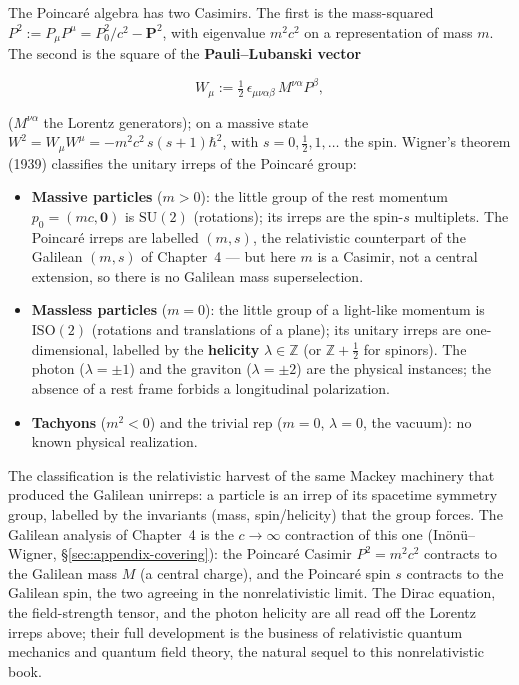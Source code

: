 The Poincar\'e algebra has two Casimirs. The first is the mass-squared $P^{2}:=P_{\mu}P^{\mu}=P_{0}^{2}/c^{2}-\bm P^{2}$, with eigenvalue $m^{2}c^{2}$ on a representation of mass $m$. The second is the square of the \textbf{Pauli--Lubanski vector}
\begin{linenomath}
\begin{equation}
W_{\mu}:=\tfrac12\,\epsilon_{\mu\nu\alpha\beta}\,M^{\nu\alpha}P^{\beta},
\label{eq:pauli-lubanski}
\end{equation}
\end{linenomath}
($M^{\nu\alpha}$ the Lorentz generators); on a massive state $W^{2}=W_{\mu}W^{\mu}=-m^{2}c^{2}\,s(s+1)\hbar^{2}$, with $s=0,\tfrac12,1,\ldots$ the spin. Wigner's theorem (1939) classifies the unitary irreps of the Poincar\'e group:
\begin{itemize}
\item \textbf{Massive particles} ($m>0$): the little group of the rest momentum $p_{0}=(mc,\bm 0)$ is $\mathrm{SU}(2)$ (rotations); its irreps are the spin-$s$ multiplets. The Poincar\'e irreps are labelled $(m,s)$, the relativistic counterpart of the Galilean $(m,s)$ of Chapter~4 --- but here $m$ is a Casimir, not a central extension, so there is no Galilean mass superselection.
\item \textbf{Massless particles} ($m=0$): the little group of a light-like momentum is $\mathrm{ISO}(2)$ (rotations and translations of a plane); its unitary irreps are one-dimensional, labelled by the \textbf{helicity} $\lambda\in\mathbb Z$ (or $\mathbb Z+\tfrac12$ for spinors). The photon ($\lambda=\pm1$) and the graviton ($\lambda=\pm2$) are the physical instances; the absence of a rest frame forbids a longitudinal polarization.
\item \textbf{Tachyons} ($m^{2}<0$) and the trivial rep ($m=0$, $\lambda=0$, the vacuum): no known physical realization.
\end{itemize}
The classification is the relativistic harvest of the same Mackey machinery that produced the Galilean unirreps: a particle is an irrep of its spacetime symmetry group, labelled by the invariants (mass, spin/helicity) that the group forces. The Galilean analysis of Chapter~4 is the $c\to\infty$ contraction of this one (In\"on\"u--Wigner, \S\ref{sec:appendix-covering}): the Poincar\'e Casimir $P^{2}=m^{2}c^{2}$ contracts to the Galilean mass $M$ (a central charge), and the Poincar\'e spin $s$ contracts to the Galilean spin, the two agreeing in the nonrelativistic limit. The Dirac equation, the field-strength tensor, and the photon helicity are all read off the Lorentz irreps above; their full development is the business of relativistic quantum mechanics and quantum field theory, the natural sequel to this nonrelativistic book.

